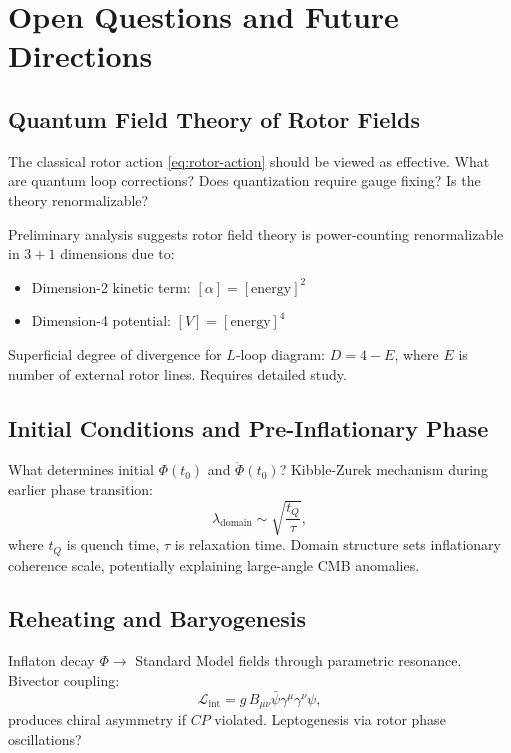 \documentclass[11pt,a4paper]{article}
\numberwithin{equation}{section}
\theoremstyle{plain}
\theoremstyle{definition}
\theoremstyle{remark}
\begin{document}
\section{Open Questions and Future Directions}
\label{sec:future}

\subsection{Quantum Field Theory of Rotor Fields}

The classical rotor action \eqref{eq:rotor-action} should be viewed as effective. What are quantum loop corrections? Does quantization require gauge fixing? Is the theory renormalizable?

Preliminary analysis suggests rotor field theory is power-counting renormalizable in $3+1$ dimensions due to:
\begin{itemize}
\item Dimension-2 kinetic term: $[\alpha] = [\mathrm{energy}]^2$
\item Dimension-4 potential: $[V] = [\mathrm{energy}]^4$
\end{itemize}

Superficial degree of divergence for $L$-loop diagram: $D = 4 - E$, where $E$ is number of external rotor lines. Requires detailed study.

\subsection{Initial Conditions and Pre-Inflationary Phase}

What determines initial $\Phi(t_0)$ and $\dot{\Phi}(t_0)$? Kibble-Zurek mechanism during earlier phase transition:
\begin{equation}
\lambda_{\mathrm{domain}} \sim \sqrt{\frac{t_Q}{\tau}},
\end{equation}
where $t_Q$ is quench time, $\tau$ is relaxation time. Domain structure sets inflationary coherence scale, potentially explaining large-angle CMB anomalies.

\subsection{Reheating and Baryogenesis}

Inflaton decay $\Phi \to$ Standard Model fields through parametric resonance. Bivector coupling:
\begin{equation}
\mathcal{L}_{\mathrm{int}} = g\,B_{\mu\nu}\bar{\psi}\gamma^\mu\gamma^\nu\psi,
\end{equation}
produces chiral asymmetry if $CP$ violated. Leptogenesis via rotor phase oscillations?
\end{document}
